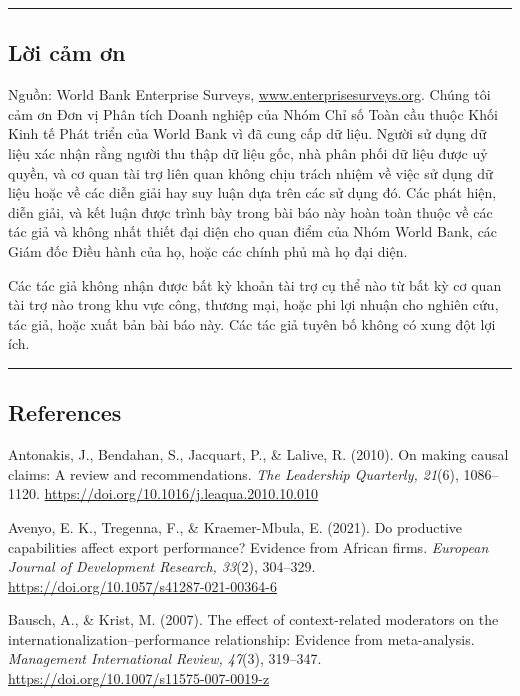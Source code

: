 \documentclass[12pt,a4paper]{article}
\begin{document}
\begin{center}\rule{0.5\linewidth}{0.5pt}\end{center}

\hypertarget{lux1eddi-cux1ea3m-ux1a1n}{%
\subsection{Lời cảm ơn}\label{lux1eddi-cux1ea3m-ux1a1n}}

Nguồn: World Bank Enterprise Surveys,
\href{http://www.enterprisesurveys.org}{www.enterprisesurveys.org}.
Chúng tôi cảm ơn Đơn vị Phân tích Doanh nghiệp của Nhóm Chỉ số Toàn cầu
thuộc Khối Kinh tế Phát triển của World Bank vì đã cung cấp dữ liệu.
Người sử dụng dữ liệu xác nhận rằng người thu thập dữ liệu gốc, nhà phân
phối dữ liệu được uỷ quyền, và cơ quan tài trợ liên quan không chịu
trách nhiệm về việc sử dụng dữ liệu hoặc về các diễn giải hay suy luận
dựa trên các sử dụng đó. Các phát hiện, diễn giải, và kết luận được
trình bày trong bài báo này hoàn toàn thuộc về các tác giả và không nhất
thiết đại diện cho quan điểm của Nhóm World Bank, các Giám đốc Điều hành
của họ, hoặc các chính phủ mà họ đại diện.

Các tác giả không nhận được bất kỳ khoản tài trợ cụ thể nào từ bất kỳ cơ
quan tài trợ nào trong khu vực công, thương mại, hoặc phi lợi nhuận cho
nghiên cứu, tác giả, hoặc xuất bản bài báo này. Các tác giả tuyên bố
không có xung đột lợi ích.

\begin{center}\rule{0.5\linewidth}{0.5pt}\end{center}

\hypertarget{references}{%
\subsection{References}\label{references}}

Antonakis, J., Bendahan, S., Jacquart, P., \& Lalive, R. (2010). On
making causal claims: A review and recommendations. \emph{The Leadership
Quarterly, 21}(6), 1086--1120.
\url{https://doi.org/10.1016/j.leaqua.2010.10.010}

Avenyo, E. K., Tregenna, F., \& Kraemer-Mbula, E. (2021). Do productive
capabilities affect export performance? Evidence from African firms.
\emph{European Journal of Development Research, 33}(2), 304--329.
\url{https://doi.org/10.1057/s41287-021-00364-6}

Bausch, A., \& Krist, M. (2007). The effect of context-related
moderators on the internationalization--performance relationship:
Evidence from meta-analysis. \emph{Management International Review,
47}(3), 319--347. \url{https://doi.org/10.1007/s11575-007-0019-z}
\end{document}
